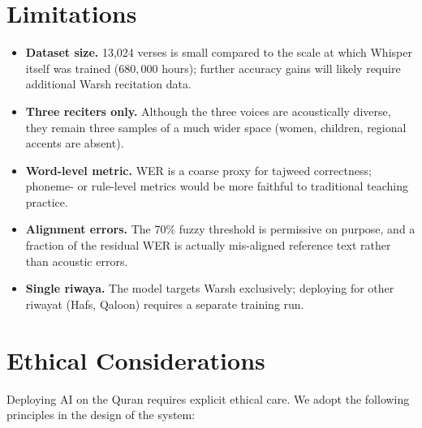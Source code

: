 \documentclass[12pt,a4paper]{report}
\begin{document}
\section{Limitations}

\begin{warnbox}[title=Known limitations]
\begin{itemize}
  \item \textbf{Dataset size.} 13{,}024 verses is small compared to the
        scale at which Whisper itself was trained ($680{,}000$ hours);
        further accuracy gains will likely require additional Warsh
        recitation data.
  \item \textbf{Three reciters only.} Although the three voices are
        acoustically diverse, they remain three samples of a much wider
        space (women, children, regional accents are absent).
  \item \textbf{Word-level metric.} WER is a coarse proxy for tajweed
        correctness; phoneme- or rule-level metrics would be more
        faithful to traditional teaching practice.
  \item \textbf{Alignment errors.} The 70\% fuzzy threshold is
        permissive on purpose, and a fraction of the residual WER is
        actually mis-aligned reference text rather than acoustic
        errors.
  \item \textbf{Single riwaya.} The model targets Warsh exclusively;
        deploying for other riwayat (Hafs, Qaloon) requires a separate
        training run.
\end{itemize}
\end{warnbox}

\section{Ethical Considerations}

Deploying AI on the Quran requires explicit ethical care. We adopt the
following principles in the design of the system:
\end{document}
